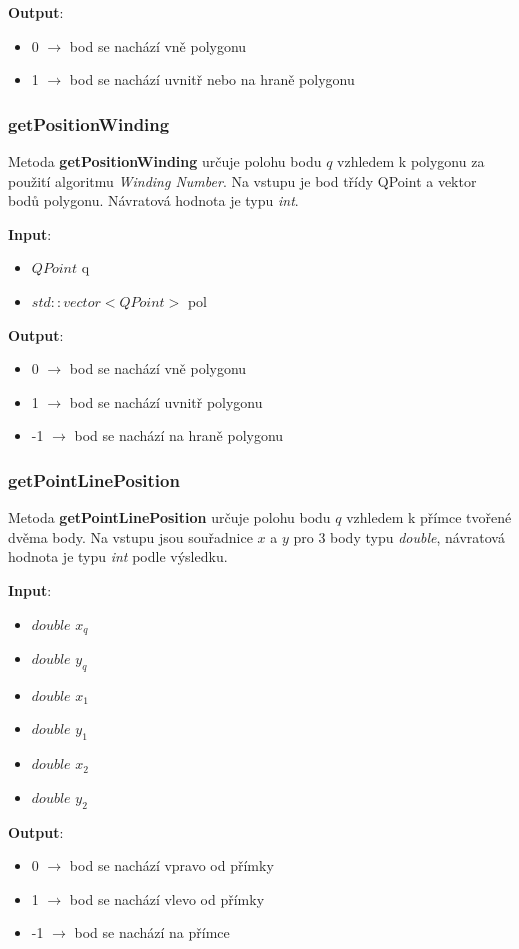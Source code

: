 \documentclass[a4paper, 12pt]{article}
\begin{document}
\textbf{Output}:
\begin{itemize}
\item 0 $\rightarrow$ bod se nachází vně polygonu
\item 1 $\rightarrow$ bod se nachází uvnitř nebo na hraně polygonu
\end{itemize}

\subsubsection{getPositionWinding}
Metoda \textbf{getPositionWinding} určuje polohu bodu $q$ vzhledem k polygonu za použití algoritmu \textsl{Winding Number}. Na vstupu je bod třídy QPoint a vektor bodů polygonu. Návratová hodnota je typu \textsl{int}.

\textbf{Input}:
\begin{itemize}
\item $QPoint$ q
\item $std::vector<QPoint>$ pol
\end{itemize}

\textbf{Output}:
\begin{itemize}
\item 0 $\rightarrow$ bod se nachází vně polygonu
\item 1 $\rightarrow$ bod se nachází uvnitř polygonu
\item -1 $\rightarrow$ bod se nachází na hraně polygonu
\end{itemize}

\subsubsection{getPointLinePosition}
Metoda \textbf{getPointLinePosition} určuje polohu bodu $q$ vzhledem k přímce tvořené dvěma body. Na vstupu jsou souřadnice $x$ a $y$ pro 3 body typu \textit{double}, návratová hodnota je typu \textit{int} podle výsledku. 

\textbf{Input}:
\begin{itemize}
\item $double$ $x_q$
\item $double$ $y_q$
\item $double$ $x_1$
\item $double$ $y_1$
\item $double$ $x_2$
\item $double$ $y_2$
\end{itemize}

\textbf{Output}:
\begin{itemize}
\item 0 $\rightarrow$ bod se nachází vpravo od přímky
\item 1 $\rightarrow$ bod se nachází vlevo od přímky
\item -1 $\rightarrow$ bod se nachází na přímce
\end{itemize}
\end{document}
